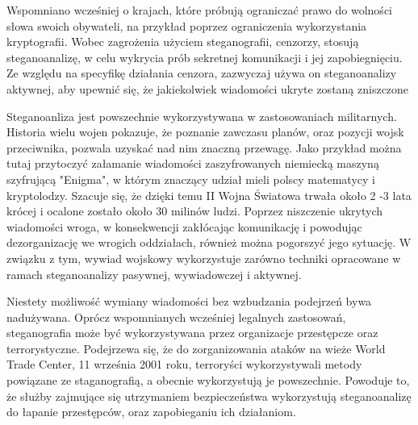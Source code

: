 \documentclass[a4paper, twoside]{report}
\begin{document}
        Wspomniano wcześniej o krajach, które próbują ograniczać
        prawo do wolności słowa swoich obywateli, na przykład poprzez ograniczenia
        wykorzystania kryptografii. Wobec zagrożenia użyciem steganografii, cenzorzy,
        stosują steganoanalizę, w celu wykrycia prób sekretnej komunikacji i jej zapobiegnięciu.
        Ze względu na specyfikę działania cenzora, zazwyczaj używa on steganoanalizy
        aktywnej, aby upewnić się, że jakiekolwiek wiadomości ukryte zostaną zniszczone

        Steganoanliza jest powszechnie wykorzystywana w zastosowaniach militarnych.
        Historia wielu wojen pokazuje, że poznanie zawczasu planów, oraz pozycji
        wojsk przeciwnika, pozwala uzyskać nad nim znaczną przewagę. Jako przykład
        można tutaj przytoczyć załamanie wiadomości zaszyfrowanych niemiecką maszyną
        szyfrującą "Enigma", w którym znaczący udział mieli polscy matematycy i kryptolodzy.
        Szacuje się, że dzięki temu II Wojna Światowa trwała około 2 -3 lata krócej
        i ocalone zostało około 30 milinów ludzi. Poprzez niszczenie ukrytych wiadomości wroga,
        w konsekwencji zakłócając komunikację i powodując dezorganizację we wrogich oddziałach,
        również można pogorszyć jego sytuację.
        W związku z tym, wywiad wojskowy wykorzystuje zarówno techniki opracowane w
        ramach steganoanalizy pasywnej, wywiadowczej i aktywnej.

        Niestety możliwość wymiany wiadomości bez wzbudzania podejrzeń bywa nadużywana.
        Oprócz wspomnianych wcześniej legalnych zastosowań, steganografia może
        być wykorzystywana przez organizacje przestępcze oraz terrorystyczne. Podejrzewa
        się, że do zorganizowania ataków na wieże World Trade Center, 11 września 2001 roku,
        terroryści wykorzystywali metody powiązane ze staganografią, a obecnie wykorzystują
        je powszechnie\cite{TERRORISMANDSTEGANOGRAPHY}.
        Powoduje to, że służby zajmujące się utrzymaniem bezpieczeństwa wykorzystują
        steganoanalizę do łapanie przestępców, oraz zapobieganiu ich działaniom.
\end{document}
